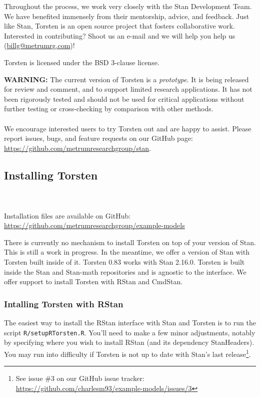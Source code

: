 \documentclass[11pt]{amsart}
\newenvironment{fmpage}[1]
     {\begin{lrbox}{\fmbox}\begin{minipage}{#1}}
     {\end{minipage}\end{lrbox}\fbox{\usebox{\fmbox}}}
\begin{document}
Throughout the process, we work very closely with the Stan Development Team. We have benefited immensely from their mentorship, advice, and feedback. Just like Stan, Torsten is an open source project that fosters collaborative work. Interested in contributing? Shoot us an e-mail and we will help you help us (\url{billg@metrumrg.com})!

Torsten is licensed under the BSD 3-clause license.

\begin{fmpage}{\textwidth}
{\bf WARNING:} The current version of Torsten is a {\em prototype}. It is being released for review and comment, and to support limited research applications. It has not been rigorously tested and should not be used for critical applications without further testing or cross-checking by comparison with other methods. \\ \ \\
We encourage interested users to try Torsten out and are happy to assist. Please report issues, bugs, and feature requests on our GitHub page: \url{https://github.com/metrumresearchgroup/stan}.
\end{fmpage}


\subsection{Installing Torsten}  \ \\ \ \\  
Installation files are available on GitHub: \url{https://github.com/metrumresearchgroup/example-models}

There is currently no mechanism to install Torsten on top of your version of Stan. This is still a work in progress. In the meantime, we offer a version of Stan with Torsten built inside of it. Torsten 0.83 works with Stan 2.16.0. Torsten is built inside the Stan and Stan-math repositories and is agnostic to the interface. We offer support to install Torsten with RStan and CmdStan.

\subsubsection{Intalling Torsten with RStan} The easiest way to install the RStan interface with Stan and Torsten is to run the script \texttt{R/setupRTorsten.R}. You'll need to make a few minor adjustments, notably by specifying where you wish to install RStan (and its dependency StanHeaders). You may run into difficulty if Torsten is not up to date with Stan's last release\footnote{See issue \#3 on our GitHub issue tracker: \url{https://github.com/charlesm93/example-models/issues/3}}.
\end{document}
